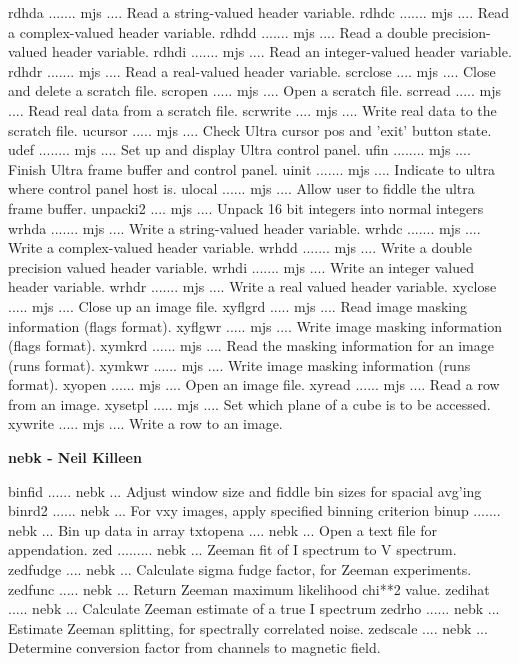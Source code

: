 {\eightpoint\begintt
rdhda ....... mjs .... Read a string-valued header variable. 
rdhdc ....... mjs .... Read a complex-valued header variable. 
rdhdd ....... mjs .... Read a double precision-valued header variable. 
rdhdi ....... mjs .... Read an integer-valued header variable. 
rdhdr ....... mjs .... Read a real-valued header variable. 
\endtt}
{\eightpoint\begintt
scrclose .... mjs .... Close and delete a scratch file. 
scropen ..... mjs .... Open a scratch file. 
scrread ..... mjs .... Read real data from a scratch file. 
scrwrite .... mjs .... Write real data to the scratch file. 
ucursor ..... mjs .... Check Ultra cursor pos and 'exit' button state. 
\endtt}
{\eightpoint\begintt
udef ........ mjs .... Set up and display Ultra control panel. 
ufin ........ mjs .... Finish Ultra frame buffer and control panel. 
uinit ....... mjs .... Indicate to ultra where control panel host is. 
ulocal ...... mjs .... Allow user to fiddle the ultra frame buffer. 
unpacki2 .... mjs .... Unpack 16 bit integers into normal integers 
\endtt}
{\eightpoint\begintt
wrhda ....... mjs .... Write a string-valued header variable. 
wrhdc ....... mjs .... Write a complex-valued header variable. 
wrhdd ....... mjs .... Write a double precision valued header variable. 
wrhdi ....... mjs .... Write an integer valued header variable. 
wrhdr ....... mjs .... Write a real valued header variable. 
\endtt}
{\eightpoint\begintt
xyclose ..... mjs .... Close up an image file. 
xyflgrd ..... mjs .... Read image masking information (flags format). 
xyflgwr ..... mjs .... Write image masking information (flags format). 
xymkrd ...... mjs .... Read the masking information for an image (runs format). 
xymkwr ...... mjs .... Write image masking information (runs format). 
\endtt}
{\eightpoint\begintt
xyopen ...... mjs .... Open an image file. 
xyread ...... mjs .... Read a row from an image. 
xysetpl ..... mjs .... Set which plane of a cube is to be accessed. 
xywrite ..... mjs .... Write a row to an image. 
\endtt}
\par\centerline {\bf nebk - Neil Killeen}
{\eightpoint\begintt
binfid ...... nebk ... Adjust window size and fiddle bin sizes for spacial avg'ing 
binrd2 ...... nebk ... For vxy images, apply specified binning criterion 
binup ....... nebk ... Bin up data in array 
txtopena .... nebk ... Open a text file for appendation. 
zed ......... nebk ... Zeeman fit of I spectrum to V spectrum. 
\endtt}
{\eightpoint\begintt
zedfudge .... nebk ... Calculate sigma fudge factor, for Zeeman experiments. 
zedfunc ..... nebk ... Return Zeeman maximum likelihood chi**2 value. 
zedihat ..... nebk ... Calculate Zeeman estimate of a true I spectrum 
zedrho ...... nebk ... Estimate Zeeman splitting, for spectrally correlated noise. 
zedscale .... nebk ... Determine conversion factor from channels to magnetic field. 
\endtt}
